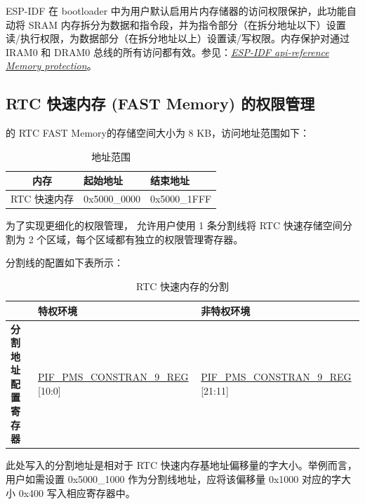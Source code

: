\documentclass[main\_\_CN.tex]{subfiles}
\begin{document}
\begin{tiplisting}
ESP-IDF 在 bootloader 中为用户默认启用片内存储器的访问权限保护，此功能自动将 SRAM 内存拆分为数据和指令段，并为指令部分（在拆分地址以下）设置读/执行权限，为数据部分（在拆分地址以上）设置读/写权限。内存保护对通过 IRAM0 和 DRAM0 总线的所有访问都有效。参见：{\it{\href{https://docs.espressif.com/projects/esp-idf/zh_CN/v4.3-beta1/esp32c3/api-reference/kconfig.html#memory-protection}{ESP-IDF api-reference Memory protection}}}。
\end{tiplisting}

\subsection{RTC 快速内存 (FAST Memory) 的权限管理}

\chipname{} 的 RTC FAST Memory的存储空间大小为 8 KB，访问地址范围如下：

\begin{longtable}[c]{ |c|l|l| }
\caption{地址范围}
\label{tab:fast-memory-address}
\\\hline
\rowcolor{lightgray}
    \textbf{内存} &  \textbf{起始地址}  &  \textbf{结束地址}\\
    \hline
    RTC 快速内存           & 0x5000\_0000 &  0x5000\_1FFF   \\
    \hline
\end{longtable}

为了实现更细化的权限管理，\chipname{} 允许用户使用 1 条分割线将 RTC 快速存储空间分割为 2 个区域，每个区域都有独立的权限管理寄存器。

分割线的配置如下表所示：
\begin{table}[H]
    \centering
    \caption{RTC 快速内存的分割}
    \label{tab:rtc_fast_mem_split}
    \begin{threeparttable}
    \begin{tabular}{|l|l|l|} \hline
    \rowcolor{lightgray}
     & \textbf{特权环境} & \textbf{非特权环境} \\\hline
    \textbf{分割地址配置寄存器}\tnote{1} & \hyperref[regdesc:PMSCORE0PIFPMSCONSTRAIN9REG]{PIF\_PMS\_CONSTRAN\_9\_REG} [10:0]  & \hyperref[regdesc:PMSCORE0PIFPMSCONSTRAIN9REG]{PIF\_PMS\_CONSTRAN\_9\_REG} [21:11] \\\hline
    \end{tabular}
        \begin{tablenotes}
        \item[1] 此处写入的分割地址是相对于 RTC 快速内存基地址偏移量的字大小。举例而言，用户如需设置 0x5000\_1000 作为分割线地址，应将该偏移量 0x1000 对应的字大小 0x400 写入相应寄存器中。
        \end{tablenotes}
    \end{threeparttable}
\end{table}
\end{document}
